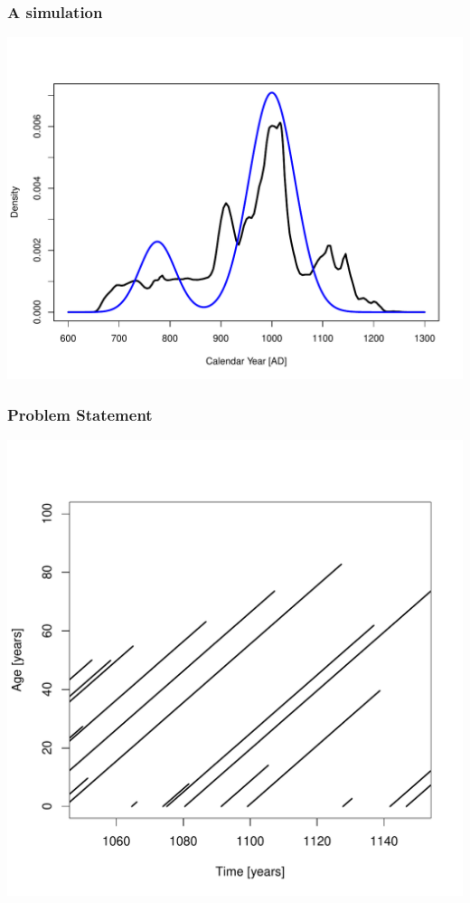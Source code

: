 \documentclass{beamer}
\begin{document}
\begin{frame}[t]
  \frametitle{A simulation}
    \includegraphics[height=.85\textheight]{spdall_sim.pdf}
\end{frame}

\begin{frame}
  \frametitle{Problem Statement}
    \begin{center}
      \includegraphics[height=.85\textheight]{lifeline_plot_no_horiz_line.pdf}
    \end{center}
\end{frame}
\end{document}
